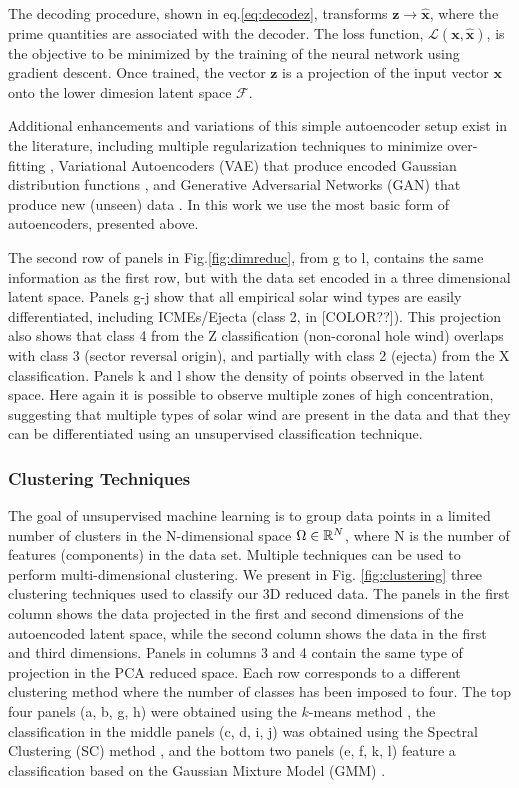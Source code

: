 The decoding procedure, shown in eq.\eqref{eq:decodez}, transforms $\boldsymbol{z}\rightarrow\boldsymbol{\hat{x}}$, where the prime quantities are associated with the decoder. The loss function, $\mathcal{L}(\boldsymbol{x}, \boldsymbol{\hat{x}})$, is the objective to be minimized by the training of the neural network using gradient descent. Once trained, the vector $\boldsymbol{z}$ is a projection of the input vector $\boldsymbol{x}$ onto the lower dimesion latent space $\boldsymbol{\mathcal{F}}$.

Additional enhancements and variations of this simple autoencoder setup exist in the literature, including multiple regularization techniques to minimize over-fitting \citep{[REF??]}, Variational Autoencoders (VAE) that produce encoded Gaussian distribution functions \citep{[REF??]}, and Generative Adversarial Networks (GAN) that produce new (unseen) data \citep{[REF??]}. In this work we use the most basic form of autoencoders, presented above.

The second row of panels in Fig.\ref{fig:dimreduc}, from g to l, contains the same information as the first row, but with the data set encoded in a three dimensional latent space. Panels g-j show that all empirical solar wind types are easily differentiated, including ICMEs/Ejecta (class 2, in [COLOR??]). This projection also shows that class 4 from the Z classification (non-coronal hole wind) overlaps with class 3 (sector reversal origin), and partially with class 2 (ejecta) from the X classification. Panels k and l show the density of points observed in the latent space. Here again it is possible to observe multiple zones of high concentration, suggesting that multiple types of solar wind are present in the data and that they can be differentiated using an unsupervised classification technique.

\subsubsection{Clustering Techniques}
\label{sec:clustering}
The goal of unsupervised machine learning is to group data points in a limited number of clusters in the N-dimensional space $\Omega\in\Bbb R^N$, where N is the number of features (components) in the data set. Multiple techniques can be used to perform multi-dimensional clustering. We present in Fig. \ref{fig:clustering} three clustering techniques used to classify our 3D reduced data. The panels in the first column shows the data projected in the first and second dimensions of the autoencoded latent space, while the second column shows the data in the first and third dimensions. Panels in columns 3 and 4 contain the same type of projection in the PCA reduced space. Each row corresponds to a different clustering method where the number of classes has been imposed to four. The top four panels (a, b, g, h) were obtained using the $k$-means method \citep{[REF??]}, the classification in the middle panels (c, d, i, j) was obtained using the Spectral Clustering (SC) method \citep{[REF??]}, and the bottom two panels (e, f, k, l) feature a classification based on the Gaussian Mixture Model (GMM) \citep{[REF??]}.

